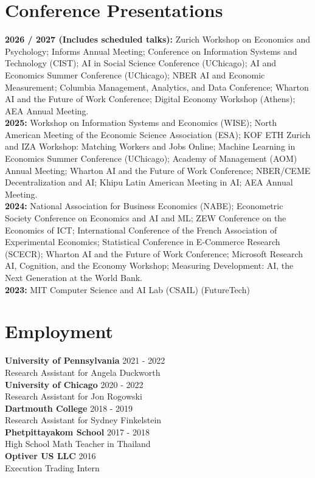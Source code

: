 \documentclass[margin,line,pifont,palatino,courier, 9pt]{res}
\begin{document}
\begin{resume}
\section{\sc Conference Presentations}
\textbf{2026 / 2027 (Includes scheduled talks):}
Zurich Workshop on Economics and Psychology;
Informs Annual Meeting;
Conference on Information Systems and Technology (CIST);
AI in Social Science Conference (UChicago);
AI and Economics Summer Conference (UChicago);
NBER AI and Economic Measurement;
Columbia Management, Analytics, and Data Conference;
Wharton AI and the Future of Work Conference;
Digital Economy Workshop (Athens);
AEA Annual Meeting.\vspace{2mm}\\
\textbf{2025:}
Workshop on Information Systems and Economics (WISE);
North American Meeting of the Economic Science Association (ESA);
KOF ETH Zurich and IZA Workshop: Matching Workers and Jobs Online;
Machine Learning in Economics Summer Conference (UChicago);
Academy of Management (AOM) Annual Meeting;
Wharton AI and the Future of Work Conference;
NBER/CEME Decentralization and AI;
Khipu Latin American Meeting in AI;
AEA Annual Meeting.\vspace{2mm}\\
\textbf{2024:}
National Association for Business Economics (NABE);
Econometric Society Conference on Economics and AI and ML;
ZEW Conference on the Economics of ICT;
International Conference of the French Association of Experimental Economics;
Statistical Conference in E-Commerce Research (SCECR);
Wharton AI and the Future of Work Conference;
Microsoft Research AI, Cognition, and the Economy Workshop;
Measuring Development: AI, the Next Generation at the World Bank.
\vspace{2mm}\\
\textbf{2023:} MIT Computer Science and AI Lab (CSAIL) (FutureTech)



\section{\sc Employment}
\textbf{University of Pennsylvania} \hfill 2021 - 2022 \\
Research Assistant for Angela Duckworth \vspace{2mm}\\
\textbf{University of Chicago} \hfill 2020 - 2022\\
Research Assistant for Jon Rogowski \vspace{2mm}\\
\textbf{Dartmouth College} \hfill 2018 - 2019 \\
Research Assistant for Sydney Finkelstein \vspace{2mm}\\
\textbf{Phetpittayakom School} \hfill 2017 - 2018 \\
High School Math Teacher in Thailand \vspace{2mm}\\
\textbf{Optiver US LLC} \hfill 2016 \\
Execution Trading Intern

\end{resume}
\end{document}
